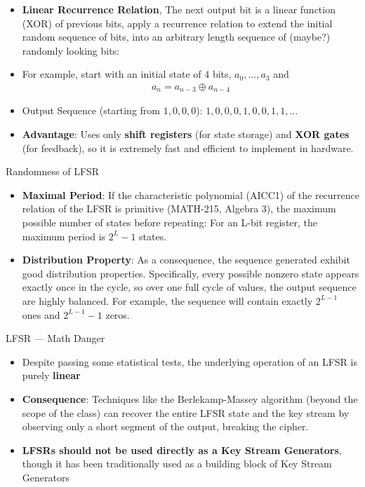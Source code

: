 \begin{itemize}
    \item  \textbf{Linear Recurrence Relation}, The next output bit is a linear function (XOR) of previous bits, apply a recurrence relation to extend the initial random sequence of bits, into an arbitrary length sequence of (maybe?) randomly looking bits:
    \item For example, start with an initial state of 4 bits, $a_0, \ldots, a_3$ and 
		\begin{align*} 
			a_n =  a_{n-3} \oplus a_{n-4} 
		\end{align*}
		\item Output Sequence (starting from $1, 0, 0, 0$): $1, 0, 0, 0, 1, 0, 0, 1, 1, \ldots$
		\item \textbf{Advantage}: Uses only \textbf{shift registers} (for state storage) and \textbf{XOR gates} (for feedback), so it is extremely fast and efficient to implement in hardware.
\end{itemize}
\begin{parag}{Randomness of LFSR}
    \begin{itemize}
        \item \textbf{Maximal Period}: If the characteristic polynomial (AICC1) of the recurrence relation of the LFSR is primitive (MATH-215, Algebra 3), the maximum possible number of states before repeating: For an L-bit register, the maximum period is $2^{L}-1$ states.
    	\item \textbf{Distribution Property}: As a consequence, the sequence generated exhibit good distribution properties. Specifically, every possible nonzero state appears exactly once in the cycle, so over one full cycle of values, the output sequence are highly balanced. For example, the sequence will contain exactly $2^{L-1}$ ones and $2^{L-1}-1$ zeros. 
    \end{itemize}
\end{parag}
\begin{parag}{LFSR --- Math Danger}
    \begin{itemize}
        \item Despite passing some statistical tests, the underlying operation of an LFSR is purely \textbf{linear}
        \item \textbf{Consequence}: Techniques like the Berlekamp-Massey algorithm (beyond the scope of the class) can recover the entire LFSR state and the key stream by observing only a short segment of the output, breaking the cipher.
        \item \textbf{LFSRs should not be used directly as a Key Stream Generators}, though it has been traditionally used as a building block of Key Stream Generators
    \end{itemize}
\end{parag}

